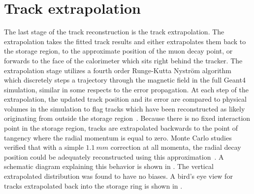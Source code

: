 

\clearpage %


\section{Track extrapolation}
\label{sec:TrackExtrapolation}

The last stage of the track reconstruction is the track extrapolation. The extrapolation takes the fitted track results and either extrapolates them back to the storage region, to the approximate position of the muon decay point, or forwards to the face of the calorimeter which sits right behind the tracker. The extrapolation stage utilizes a fourth order Runge-Kutta Nystr\"{o}m algorithm~\cite{SCThesis} which discretely steps a trajectory through the magnetic field in the full \gmtwo Geant4 simulation, similar in some respects to the error propagation. At each step of the extrapolation, the updated track position and its error are compared to physical volumes in the simulation to flag tracks which have been reconstructed as likely originating from outside the storage region~\cite{SCThesis,extrapolationerrors}. Because there is no fixed interaction point in the storage region, tracks are extrapolated backwards to the point of tangency where the radial momentum is equal to zero. Monte Carlo studies verified that with a simple $\SI{1.1}{mm}$ correction at all momenta, the radial decay position could be adequately reconstructed using this approximation~\cite{SCThesis}. A schematic diagram explaining this behavior is shown in . The vertical extrapolated distribution was found to have no biases. A bird's eye view for tracks extrapolated back into the storage ring is shown in .


